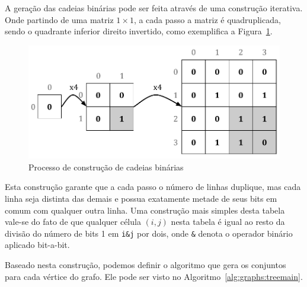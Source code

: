 A geração das cadeias binárias pode ser feita através de uma construção iterativa. Onde partindo de uma matriz $1\times1$, a cada passo a matriz é quadruplicada, sendo o quadrante inferior direito invertido, como exemplifica a Figura~\ref{fig:graph_tree_binbuild}.

\begin{figure}[!htbp]
  \centering
  \includegraphics[scale=0.6]{figures/graphs_tree_binbuild.pdf}
  \caption{Processo de construção de cadeias binárias}
  \label{fig:graph_tree_binbuild}
\end{figure}

Esta construção garante que a cada passo o número de linhas duplique, mas cada linha seja distinta das demais e possua exatamente metade de seus bits em comum com qualquer outra linha. Uma construção mais simples desta tabela vale-se do fato de que qualquer célula $(i, j)$ nesta tabela é igual ao resto da divisão do número de bits 1 em \texttt{i\&j} por dois, onde \texttt{\&} denota o operador binário aplicado bit-a-bit.

Baseado nesta construção, podemos definir o algoritmo que gera os conjuntos para cada vértice do grafo. Ele pode ser visto no Algoritmo~\ref{alg:graphs:treemain}.

